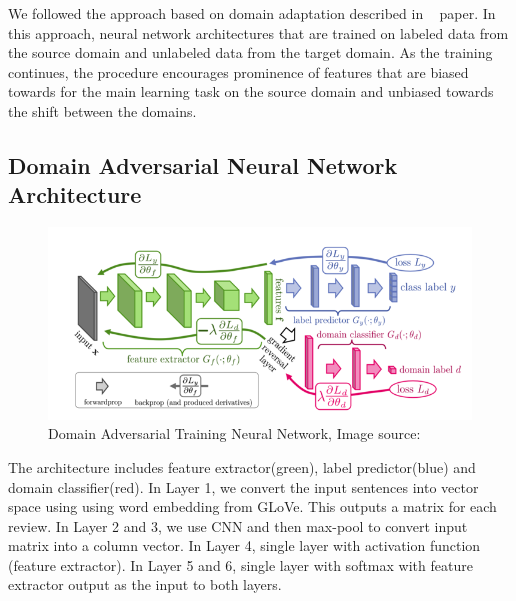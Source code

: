 \documentclass[11pt,a4paper]{article}
\begin{document}
We followed the approach based on domain adaptation described in ~\cite{Ganin:2016} paper.
In this approach, neural network architectures that are trained on labeled data from
the source domain and unlabeled data from the target domain. As the training continues,
the procedure encourages prominence of features that are biased towards for the main
learning task on the source domain and unbiased towards the shift between the domains.

\subsection{Domain Adversarial Neural Network Architecture}
\begin{figure}[htb]
\begin{center}
\includegraphics[width=\columnwidth]{dann.png}
\end{center}
\caption{Domain Adversarial Training Neural Network, Image source: ~\cite{Ganin:2016}}
\label{fig:figure2}
\end{figure}

The architecture includes feature extractor(green), label predictor(blue) and domain classifier(red). In Layer 1,  we convert the input sentences into vector space using using word embedding from GLoVe. This outputs a matrix for each review. In Layer 2 and 3,  we use CNN and then max-pool to convert input matrix into a column vector.  In Layer 4, single layer with activation function (feature extractor). In Layer 5 and 6, single layer with softmax with feature extractor output as the input to both layers.
\end{document}
